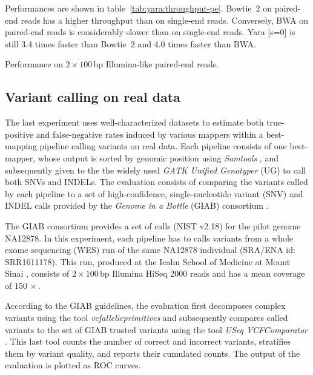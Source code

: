 Performances are shown in table~\ref{tab:yara:throughput-pe}.
Bowtie~2 on paired-end reads has a higher throughput than on single-end reads.
Conversely, BWA on paired-end reads is considerably slower than on single-end reads.
Yara [s=0] is still 3.4 times faster than Bowtie~2 and 4.0 times faster than BWA.

\begin{table}[b]
\begin{center}
\caption[Yara performance on Illumina-like paired-end reads]{Performance on $2 \times 100\,\text{bp}$ Illumina-like paired-end reads.}
\sffamily

\label{tab:yara:throughput-pe}
\end{center}
\end{table}



\subsection{Variant calling on real data}
\label{sec:yara:eval:calling}


The last experiment uses well-characterized datasets to estimate both true-positive and false-negative rates induced by various mappers within a best-mapping pipeline calling variants on real data.
Each pipeline consists of one best-mapper, whose output is sorted by genomic position using \emph{Samtools} \citep{Li2009}, and subsequently given to the the widely used \emph{GATK Unified Genotyper} (UG) \citep{DePristo2011} to call both SNVs and INDELs.
The evaluation consists of comparing the variants called by each pipeline to a set of high-confidence, single-nucleotide variant (SNV) and INDEL calls provided by the \emph{Genome in a Bottle} (GIAB) consortium \citep{Zook2014}.

The GIAB consortium provides a set of calls (NIST v2.18) for the pilot genome NA12878.
In this experiment, each pipeline has to calls variants from a whole exome sequencing (WES) run of the same NA12878 individual (SRA/ENA id: SRR1611178).
This run, produced at the Icahn School of Medicine at Mount Sinai \citep{Linderman2014}, consists of $2 \times 100\,\text{bp}$ Illumina HiSeq 2000 reads and has a mean coverage of $150\, \times$.

According to the GIAB guidelines, the evaluation first decomposes complex variants using the tool \emph{vcfallelicprimitives} \citep{Danecek2011} and subsequently compares called variants to the set of GIAB trusted variants using the tool \emph{USeq VCFComparator} \citep{Nix2008}.
This last tool counts the number of correct and incorrect variants, stratifies them by variant quality, and reports their cumulated counts.
The output of the evaluation is plotted as ROC curves.

